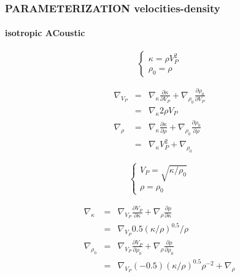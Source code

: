 \documentclass[9pt]{beamer}
\newcommand{\partderi}[2]{\frac{\partial#1}{\partial#2}}
\begin{document}
\begin{frame}\frametitle{PARAMETERIZATION velocities-density}
\framesubtitle{isotropic ACoustic}
  
  \begin{minipage}{0.4\linewidth}
    \[\left\{ \begin{array}{l}
      \kappa = \rho V_P^2 \\
      \rho_0 = \rho 
    \end{array} \right.\]
    
    \begin{eqnarray}
      \nabla_{V_P} &=& \nabla_{\kappa} \partderi{\kappa}{V_P} + \nabla_{\rho_0} \partderi{\rho_0}{V_P} \nonumber\\
                   &=& \nabla_{\kappa} 2\rho V_P \nonumber\\
      \nabla_{\rho} &=& \nabla_{\kappa} \partderi{\kappa}{\rho} + \nabla_{\rho_0} \partderi{\rho_0}{\rho} \nonumber\\
		    &=& \nabla_{\kappa} V_P^2 + \nabla_{\rho_0} \nonumber
    \end{eqnarray}

  \end{minipage} \vline
  \begin{minipage}{0.4\linewidth}
    \[\left\{ \begin{array}{l}
      V_P  = \sqrt{\kappa/\rho_0} \\
      \rho = \rho_0
    \end{array} \right.\]
    
    \begin{eqnarray}
      \nabla_{\kappa} &=& \nabla_{V_P} \partderi{V_P}{\kappa} + \nabla_{\rho} \partderi{\rho}{\kappa} \nonumber\\
                      &=& \nabla_{V_P} 0.5(\kappa/\rho)^{0.5}/\rho \nonumber\\
      \nabla_{\rho_0} &=& \nabla_{V_P} \partderi{V_P}{\rho_0} + \nabla_{\rho} \partderi{\rho}{\rho_0} \nonumber\\
                      &=& \nabla_{V_P} (-0.5)(\kappa/\rho)^{0.5} \rho^{-2} + \nabla_{\rho} \nonumber
    \end{eqnarray}
  \end{minipage}

\end{frame}
\end{document}
